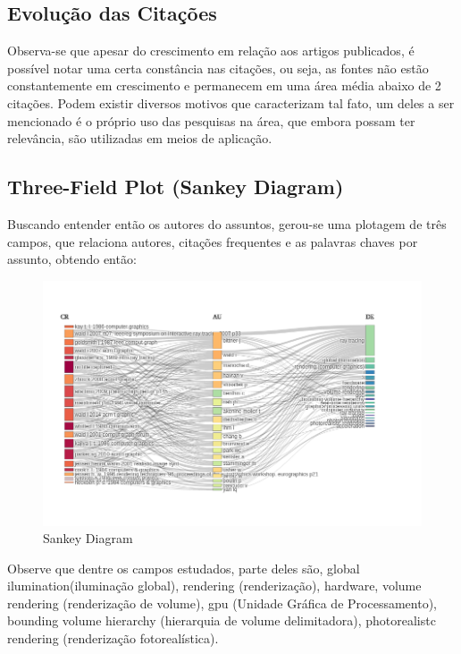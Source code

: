 \subsection{Evolução das Citações}

Observa-se que apesar do crescimento em relação aos artigos publicados, é possível notar uma certa constância nas citações, ou seja, as fontes não estão constantemente em crescimento e permanecem em uma área média abaixo de 2 citações. Podem existir diversos motivos que caracterizam tal fato, um deles a ser mencionado é o próprio uso das pesquisas na área, que embora possam ter relevância, são utilizadas em meios de aplicação.

\subsection{Three-Field Plot (Sankey Diagram)}

Buscando entender então os autores do assuntos, gerou-se uma plotagem de três campos, que relaciona autores, citações frequentes e as palavras chaves por assunto, obtendo então:

\begin{figure}[H]
    \centering
    \includegraphics[width=1\textwidth]{experiments/uventura/AnaliseBibliometrica/Images/ThreeFields.png}
    \caption{Sankey Diagram}
    \label{fig:uventura:bib-three-fields}
\end{figure}

Observe que dentre os campos estudados, parte deles são, global ilumination(iluminação global), rendering (renderização), hardware, volume rendering (renderização de volume), gpu (Unidade Gráfica de Processamento), bounding volume hierarchy (hierarquia de volume delimitadora), photorealistc rendering (renderização fotorealística).

